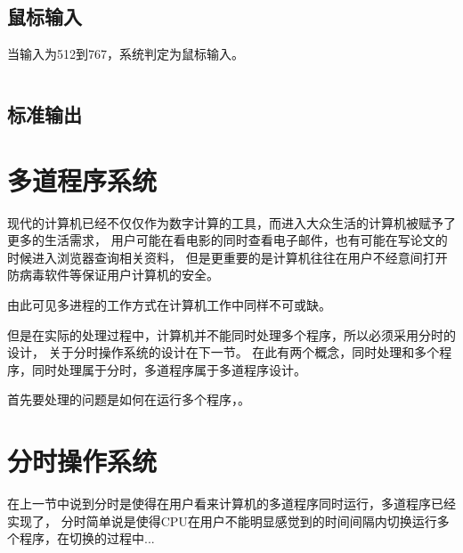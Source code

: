 \newpage
\subsection{鼠标输入}
当输入为512到767，系统判定为鼠标输入。
\begin{listing}[H]
  \inputminted[tabsize=2, firstline=247, lastline=247,
  linenos=true]{c}{../ZOS/src/kernel/bootpack.c}
\end{listing}

\newpage
\subsection{标准输出}

\newpage
\section{多道程序系统}

现代的计算机已经不仅仅作为数字计算的工具，而进入大众生活的计算机被赋予了更多的生活需求，
用户可能在看电影的同时查看电子邮件，也有可能在写论文的时候进入浏览器查询相关资料，
但是更重要的是计算机往往在用户不经意间打开防病毒软件等保证用户计算机的安全\cite{tanenbaum2009modern}。

由此可见多进程的工作方式在计算机工作中同样不可或缺。

但是在实际的处理过程中，计算机并不能同时处理多个程序，所以必须采用分时的设计，
关于分时操作系统的设计在下一节。
在此有两个概念，同时处理和多个程序，同时处理属于分时，多道程序属于多道程序设计。

首先要处理的问题是如何在运行多个程序，。

\newpage
\section{分时操作系统}

在上一节中说到分时是使得在用户看来计算机的多道程序同时运行，多道程序已经实现了，
分时简单说是使得CPU在用户不能明显感觉到的时间间隔内切换运行多个程序，在切换的过程中...
